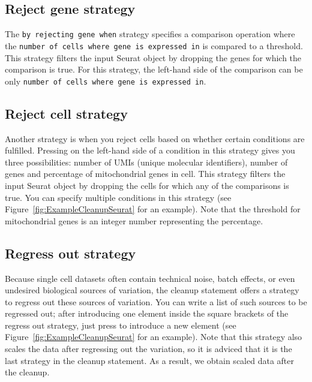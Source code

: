 \subsection{Reject gene strategy}
The \texttt{by rejecting gene when} strategy specifies a comparison operation where the
\texttt{number of cells where gene is expressed in} is compared to a threshold.
This strategy filters the input Seurat object by dropping the genes for which
the comparison is true. For this strategy, the left-hand side of the comparison can be
only \texttt{number of cells where gene is expressed in}.

\subsection{Reject cell strategy}
Another strategy is when you reject cells based on whether certain conditions are fulfilled.
Pressing \keys{\ctrl+\space} on the left-hand side of a condition in this strategy gives you
three possibilities: number of UMIs (unique molecular identifiers), number of genes and
percentage of mitochondrial genes in cell. This strategy filters the input Seurat object
by dropping the cells for which any of the comparisons is true. You can specify multiple
conditions in this strategy (see Figure~\ref{fig:ExampleCleanupSeurat} for an example). Note
that the threshold for mitochondrial genes is an integer number representing the percentage. 

\subsection{Regress out strategy}
Because single cell datasets often contain technical noise, batch effects, or even undesired
biological sources of variation, the cleanup statement offers a strategy to regress out
these sources of variation. You can write a list of such sources to be regressed out;
after introducing one element inside the square brackets of the regress out strategy, just
press \keys{\return} to introduce a new element (see Figure~\ref{fig:ExampleCleanupSeurat}
for an example). Note that this strategy also scales the data after regressing out the
variation, so it is adviced that it is the last strategy in the cleanup statement. As a result,
we obtain scaled data after the cleanup.

